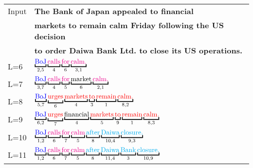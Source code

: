 \documentclass[11pt]{article}
\begin{document}
\begin{table}[t]
\centering
\setlength{\tabcolsep}{3pt}
\renewcommand{\arraystretch}{1.2}
\centering
\begin{fontpbk}
\begin{scriptsize}
\begin{tabular}{l|l}
Input & \textbf{The Bank of Japan appealed to financial}\\
& \textbf{markets to remain calm Friday following the US decision}\\
& \textbf{to order Daiwa Bank Ltd. to close its US operations.}\\
\hline
\hline
\Bstrut L=6 & $\underbracket{\mbox{\textcolor{blue}{BoJ}}}_{2,5} \underbracket{\mbox{\textcolor{magenta}{calls}}}_{4} \underbracket{\mbox{\textcolor{magenta}{for}}}_{6} \underbracket{\mbox{\textcolor{magenta}{calm.}}}_{3,1}$\\ 
L=7 & $\underbracket{\mbox{\textcolor{blue}{BoJ}}}_{3,7} \underbracket{\mbox{\textcolor{magenta}{calls}}}_{4} \underbracket{\mbox{\textcolor{magenta}{for}}}_{5} \underbracket{\mbox{market}}_{6} \underbracket{\mbox{\textcolor{magenta}{calm.}}}_{2,1}$\\
L=8 & $\underbracket{\mbox{\textcolor{blue}{BoJ}}}_{5,7} \underbracket{\mbox{\textcolor{red}{urges}}}_{6} \underbracket{\mbox{\textcolor{red}{markets}}}_{4} \underbracket{\mbox{\textcolor{red}{to}}}_{3} \underbracket{\mbox{\textcolor{red}{remain}}}_{1} \underbracket{\mbox{\textcolor{red}{calm.}}}_{8,2}$\\
L=9 & $\underbracket{\mbox{\textcolor{blue}{BoJ}}}_{6,2} \underbracket{\mbox{\textcolor{red}{urges}}}_{7} \underbracket{\mbox{financial}}_{4} \underbracket{\mbox{\textcolor{red}{markets}}}_{5} \underbracket{\mbox{\textcolor{red}{to}}}_{9} \underbracket{\mbox{\textcolor{red}{remain}}}_{1} \underbracket{\mbox{\textcolor{red}{calm.}}}_{8,3}$\\
L=10 & $\underbracket{\mbox{\textcolor{blue}{BoJ}}}_{1,2} \underbracket{\mbox{\textcolor{magenta}{calls}}}_{6} \underbracket{\mbox{\textcolor{magenta}{for}}}_{7} \underbracket{\mbox{\textcolor{magenta}{calm}}}_{5} \underbracket{\mbox{\textcolor{cyan}{after}}}_{8} \underbracket{\mbox{\textcolor{cyan}{Daiwa}}}_{10,4} \underbracket{\mbox{\textcolor{cyan}{closure.}}}_{9,3}$\\
L=11 & $\underbracket{\mbox{\textcolor{blue}{BoJ}}}_{1,2} \underbracket{\mbox{\textcolor{magenta}{calls}}}_{6} \underbracket{\mbox{\textcolor{magenta}{for}}}_{7} \underbracket{\mbox{\textcolor{magenta}{calm}}}_{5} \underbracket{\mbox{\textcolor{cyan}{after}}}_{8} \underbracket{\mbox{\textcolor{cyan}{Daiwa}}}_{11,4} \underbracket{\mbox{\textcolor{cyan}{Bank}}}_{3} \underbracket{\mbox{\textcolor{cyan}{closure.}}}_{10,9}$\\

\end{tabular}
\end{scriptsize}
\end{fontpbk}
\end{table}
\end{document}
